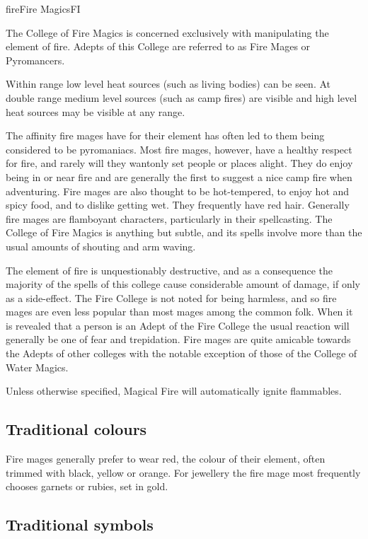 \begin{College}[2.0]{fire}{Fire Magics}{FI}

The College of Fire Magics is concerned exclusively with manipulating
the element of fire.  Adepts of this College are referred to as Fire
Mages or Pyromancers.

Within range low level heat sources (such as living bodies) can be
seen. At double range medium level sources (such as camp fires) are
visible and high level heat sources may be visible at any range.

The affinity fire mages have for their element has often led to them
being considered to be pyromaniacs.  Most fire mages, however, have a
healthy respect for fire, and rarely will they wantonly set people or
places alight. They do enjoy being in or near fire and are generally
the first to suggest a nice camp fire when adventuring.  Fire mages
are also thought to be hot-tempered, to enjoy hot and spicy food, and
to dislike getting wet.  They frequently have red hair.  Generally
fire mages are flamboyant characters, particularly in their
spellcasting. The College of Fire Magics is anything but subtle, and
its spells involve more than the usual amounts of shouting and arm
waving.

The element of fire is unquestionably destructive, and as a
consequence the majority of the spells of this college cause
considerable amount of damage, if only as a side-effect.  The Fire
College is not noted for being harmless, and so fire mages are even
less popular than most mages among the common folk. When it is
revealed that a person is an Adept of the Fire College the usual
reaction will generally be one of fear and trepidation.  Fire mages
are quite amicable towards the Adepts of other colleges with the
notable exception of those of the College of Water Magics.

Unless otherwise specified, Magical Fire will automatically ignite
flammables.

\subsection{Traditional colours}

Fire mages generally prefer to wear red, the colour of their element,
often trimmed with black, yellow or orange.  For jewellery the fire
mage most frequently chooses garnets or rubies, set in gold.

\subsection{Traditional symbols}


\end{College}
